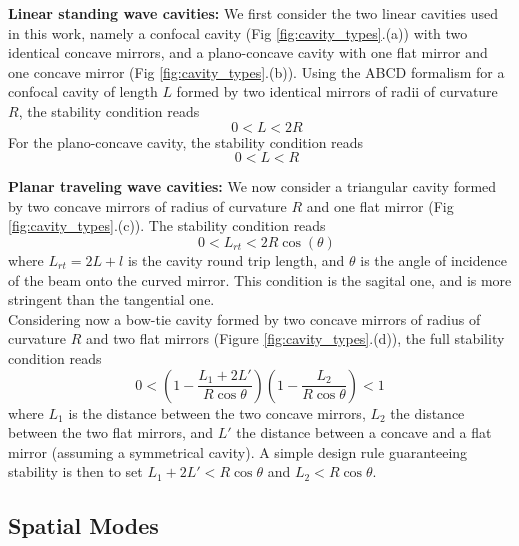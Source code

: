\noindent \textbf{Linear standing wave cavities:} We first consider the two linear cavities used in this work, namely a confocal cavity (Fig \ref{fig:cavity_types}.(a)) with two identical concave mirrors, and a plano-concave cavity with one flat mirror and one concave mirror  (Fig \ref{fig:cavity_types}.(b)). Using the ABCD formalism for a confocal cavity of length $L$ formed by two identical mirrors of radii of curvature $R$, the stability condition reads
\begin{equation}
   \quad 0 < L < 2R
\end{equation}
For the plano-concave cavity, the stability condition reads
\begin{equation}
\quad 0 < L < R
\end{equation}

\noindent \textbf{Planar traveling wave cavities:} We now consider a triangular cavity formed by two concave mirrors of radius of curvature $R$ and one flat mirror  (Fig \ref{fig:cavity_types}.(c)). The stability condition reads
\begin{equation}
   \quad 0 < L_{rt} < 2R \cos(\theta)
\end{equation}
where $L_{rt} = 2L + l$ is the cavity round trip length, and $\theta$ is the angle of incidence of the beam onto the curved mirror. This condition is the sagital one, and is more stringent than the tangential one.\\

Considering now a bow-tie cavity formed by two concave mirrors of radius of curvature $R$ and two flat mirrors  (Figure \ref{fig:cavity_types}.(d)), the full stability condition reads
\begin{equation}
  0 < \left( 1 - \frac{L_1 + 2L'}{R \cos\theta} \right) \left( 1 - \frac{L_2}{R \cos\theta} \right) < 1
\end{equation}
where $L_1$ is the distance between the two concave mirrors, $L_2$ the distance between the two flat mirrors, and $L'$ the distance between a concave and a flat mirror (assuming a symmetrical cavity). A simple design rule guaranteeing stability is then to set $L_1 + 2L' < R \cos\theta$ and $L_2 < R \cos\theta$.\\

\subsection{Spatial Modes}

